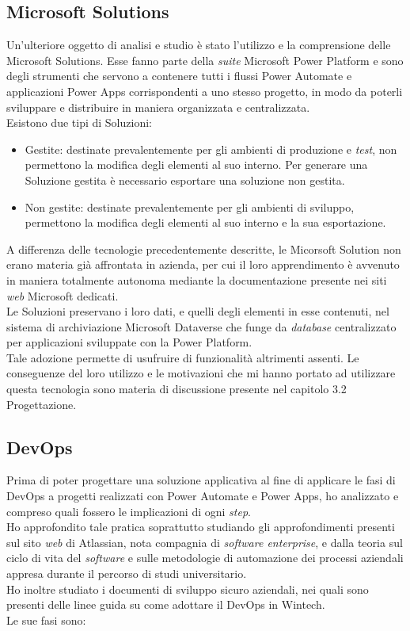 \subsection{Microsoft Solutions}
Un'ulteriore oggetto di analisi e studio è stato l'utilizzo e la comprensione delle Microsoft Solutions. Esse fanno parte della \emph{suite} Microsoft Power Platform e sono degli strumenti che servono a contenere tutti i flussi Power Automate e applicazioni Power Apps corrispondenti a uno stesso progetto, in modo da poterli sviluppare e distribuire in maniera organizzata e centralizzata.\\
Esistono due tipi di Soluzioni: 
\begin{itemize}
    \item Gestite: destinate prevalentemente per gli ambienti di produzione e \emph{test}, non permettono la modifica degli elementi al suo interno. Per generare una Soluzione gestita è necessario esportare una soluzione non gestita.
    \item Non gestite: destinate prevalentemente per gli ambienti di sviluppo, permettono la modifica degli elementi al suo interno e la sua esportazione.
\end{itemize}
A differenza delle tecnologie precedentemente descritte, le Micorsoft Solution non erano materia già affrontata in azienda, per cui il loro apprendimento è avvenuto in maniera totalmente autonoma mediante la documentazione presente nei siti \emph{web} Microsoft dedicati.\\
Le Soluzioni preservano i loro dati, e quelli degli elementi in esse contenuti, nel sistema di archiviazione Microsoft Dataverse che funge da \emph{database} centralizzato per applicazioni sviluppate con la Power Platform.\\
Tale adozione permette di usufruire di funzionalità altrimenti assenti. Le conseguenze del loro utilizzo e le motivazioni che mi hanno portato ad utilizzare questa tecnologia sono materia di discussione presente nel capitolo 3.2 Progettazione.\\

\subsection{DevOps}
Prima di poter progettare una soluzione applicativa al fine di applicare le fasi di \gls{DevOps} a progetti realizzati con Power Automate e Power Apps, ho analizzato e compreso quali fossero le implicazioni di ogni \emph{step}.\\
Ho approfondito tale pratica soprattutto studiando gli approfondimenti presenti sul sito \emph{web} di Atlassian, nota compagnia di \emph{software enterprise}, e dalla teoria sul ciclo di vita del \emph{software} e sulle metodologie di automazione dei processi aziendali appresa durante il percorso di studi universitario.\\
Ho inoltre studiato i documenti di sviluppo sicuro aziendali, nei quali sono presenti delle linee guida su come adottare il \gls{DevOps} in Wintech.\\
Le sue fasi sono:
